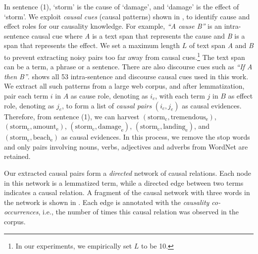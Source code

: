 In sentence (1),
`storm' is the cause of `damage', and `damage' is the effect of `storm'.
We exploit {\em causal cues} (causal patterns) shown in ,
to identify cause and effect roles for our causality knowledge.
For example, \textit{``A cause B''} is an intra-sentence causal
cue where \textit{A} is a text span that represents the cause
and \textit{B} is a span that represents the effect.
We set a maximum length $L$
of text span \textit{A} and \textit{B} to prevent
extracting noisy pairs too far away from causal cues.\footnote{In our
experiments, we empirically set $L$ to be 10.}
The text span can be a term, a phrase or a sentence.
There are also discourse cues such as \textit{``If A then B''}.
 shows all 53 intra-sentence and discourse
causal cues used in this work.
We extract all such patterns from a large web corpus, and after lemmatization,
pair each term $i$ in $A$ as cause role, denoting as $i_c$, with each term $j$
in $B$ as effect role, denoting as $j_e$, to form a list of
\textit{causal pairs} $(i_c,j_e)$ as causal evidences.
Therefore, from sentence (1), we can harvest
$(\text{storm}_{\text{c}}, \text{tremendous}_{\text{e}})$,
$(\text{storm}_{\text{c}}, \text{amount}_{\text{e}})$,
$(\text{storm}_{\text{c}}, \text{damage}_{\text{e}})$,
$(\text{storm}_{\text{c}}, \text{landing}_{\text{e}})$,
and $(\text{storm}_{\text{c}}, \text{beach}_{\text{e}})$
as causal evidences.
In this process, we remove the stop words and only pairs involving nouns, verbs,
adjectives and adverbs from WordNet are retained.

Our extracted causal pairs form a {\em directed} network of causal relations.
Each node in this network is a lemmatized term,
while a directed edge between two terms indicates a causal relation.
A fragment of the causal network with three words in the network is
shown in .
Each edge is annotated with the {\em causality co-occurrences}, i.e.,
the number of times this causal relation was observed in the corpus.


